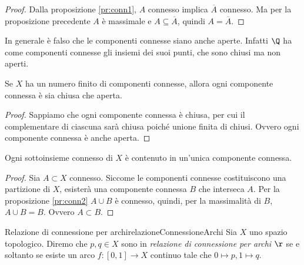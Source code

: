 \begin{proof}
	Dalla proposizione \ref{pr:conn1}, \(A\) connesso implica \(\overline{A}\) connesso.
	Ma per la proposizione precedente \(A\) è massimale e \(A\subseteq \overline{A}\), quindi \(A=\overline{A}\).
\end{proof}

\begin{oss}
	In generale è falso che le componenti connesse siano anche aperte.
	Infatti \(\Q\) ha come componenti connesse gli insiemi dei suoi punti, che sono chiusi ma non aperti.
\end{oss}

\begin{cor}
	Se \(X\) ha un numero finito di componenti connesse, allora ogni componente connessa è sia chiusa che aperta.
\end{cor}

\begin{proof}
	Sappiamo che ogni componente connessa è chiusa, per cui il complementare di ciascuna sarà chiusa poiché unione finita di chiusi.
	Ovvero ogni componente connessa è anche aperta.
\end{proof}

\begin{pr}\label{pr:compConn2}
	Ogni sottoinsieme connesso di \(X\) è contenuto in un'unica componente connessa.
\end{pr}

\begin{proof}
	Sia \(A\subset X\) connesso. Siccome le componenti connesse costituiscono una partizione di \(X\), esisterà una componente connessa \(B\) che interseca \(A\).
	Per la proposizione \ref{pr:conn2} \(A\cup B\) è connesso, quindi, per la massimalità di \(B\), \(A\cup B=B\).
	Ovvero \(A\subset B\).
\end{proof}

\begin{defn}{Relazione di connessione per archi}{relazioneConnessioneArchi}
	Sia \(X\) uno spazio topologico.
	Diremo che \(p,q\in X\) sono in \emph{relazione di connessione per archi} \(\r\) se e soltanto se esiste un arco \(f\colon [0,1]\to X\) continuo tale che \(0\mapsto p,1\mapsto q\).
\end{defn}


